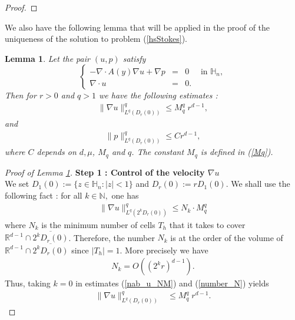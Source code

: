 \documentclass[11pt, reqno]{amsart}
\newtheorem{lemma}[theorem]{Lemma}
\theoremstyle{definition}
\theoremstyle{remark}
\numberwithin{equation}{section}
\begin{document}
\begin{appendices}
\begin{proof}
\end{proof}



\noindent We also have the following  lemma that will be applied in the proof of the uniqueness of the solution to problem (\ref{hsStokes}).

\begin{lemma}\label{estim_Lq_nabu_p}
Let the pair $\left(u, p\right)$ satisfy
		\begin{equation*}
		\left\{
		\begin{array}{rcll}
			-\nabla\cdot A (y) \nabla u +  \nabla p&=& 0& \mbox{ in } \mathbb{H}_n,\\
			\nabla\cdot u &=& 0 .
		\end{array}
		\right. 
	\end{equation*}
	Then for $r>0$ and $q>1$ we have the following estimates :
	\begin{align}\label{nab_uespL2}
		\|\nabla u  \|^q_{L^q(D_r(0))}\leq  M_q^q\; r^{d-1},
	\end{align}
	and
	\begin{align}\label{estim_Lq_Dr}
		\|p \|^q_{L^q(D_r(0))}\leq C r^{d-1},
	\end{align}
	where $C$ depends on $d, \mu$, $M_q$ and $q$. The constant $M_q$ is defined in \textup{(\ref{Mq})}.
\end{lemma}



\begin{proof}[Proof of \textup{Lemma \ref{estim_Lq_nabu_p}}]

	
	\noindent \textbf{Step 1 : Control of the velocity $\nabla u$}\\
	We set $D_{1}(0):= \{ z\in\mathbb{H}_n : |z|< 1\}$ and  $D_{r}(0):=  r D_{1}(0)$. 
	We shall use the following fact :  for all $k\in\mathbb{N},$ one has
	\begin{align}\label{nab_u_NM}
		\| \nabla u\|^q_{L^q(2^{k}D_{r}(0))}\leq N_k\cdot M^q_q
	\end{align}
	where $N_k$ is the minimum number of cells $T_h$ that it takes  to cover $\mathbb{R}^{d-1}\cap \overline{2^{k}D_{r}(0)}$. Therefore, the number $N_k$ is at the order of the volume of $\mathbb{R}^{d-1}\cap \overline{2^{k}D_{r}(0)}$ since $|T_h|=1$. More precisely we have 
	\begin{align}\label{number_N}
		N_k =O \left((2^kr)^{d-1}\right).
	\end{align}
Thus, taking $k=0$ in estimates  (\ref{nab_u_NM}) and (\ref{number_N}) yields 
	\begin{align*}
		\| \nabla u \|^q_{L^q(D_{r}(0))}&\leq M^q_q  \;  r^{d-1}.
	\end{align*}
	

\end{proof}
\end{appendices}
\end{document}
